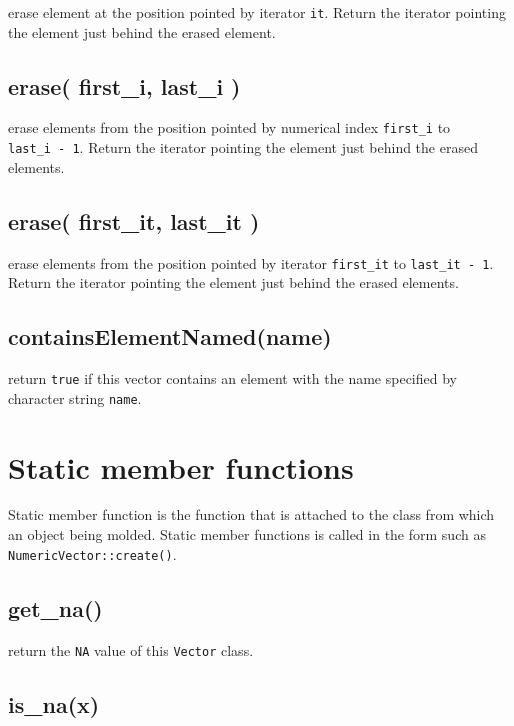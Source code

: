 \documentclass[]{book}
\theoremstyle{definition}
\theoremstyle{definition}
\theoremstyle{remark}
\begin{document}
erase element at the position pointed by iterator \texttt{it}. Return
the iterator pointing the element just behind the erased element.

\subsection{erase( first\_i, last\_i )}\label{erase-first_i-last_i}

erase elements from the position pointed by numerical index
\texttt{first\_i} to \texttt{last\_i\ -\ 1}. Return the iterator
pointing the element just behind the erased elements.

\subsection{erase( first\_it, last\_it )}\label{erase-first_it-last_it}

erase elements from the position pointed by iterator \texttt{first\_it}
to \texttt{last\_it\ -\ 1}. Return the iterator pointing the element
just behind the erased elements.

\subsection{containsElementNamed(name)}\label{containselementnamedname}

return \texttt{true} if this vector contains an element with the name
specified by character string \texttt{name}.

\section{Static member functions}\label{static-member-functions}

Static member function is the function that is attached to the class
from which an object being molded. Static member functions is called in
the form such as \texttt{NumericVector::create()}.

\subsection{get\_na()}\label{get_na}

return the \texttt{NA} value of this \texttt{Vector} class.

\subsection{is\_na(x)}\label{is_nax}
\end{document}
